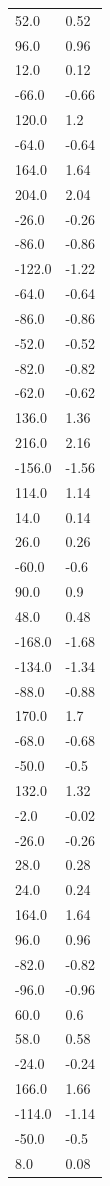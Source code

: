 \begin{longtable}{ll}
52.0 & 0.52 \\
96.0 & 0.96 \\
12.0 & 0.12 \\
-66.0 & -0.66 \\
120.0 & 1.2 \\
-64.0 & -0.64 \\
164.0 & 1.64 \\
204.0 & 2.04 \\
-26.0 & -0.26 \\
-86.0 & -0.86 \\
-122.0 & -1.22 \\
-64.0 & -0.64 \\
-86.0 & -0.86 \\
-52.0 & -0.52 \\
-82.0 & -0.82 \\
-62.0 & -0.62 \\
136.0 & 1.36 \\
216.0 & 2.16 \\
-156.0 & -1.56 \\
114.0 & 1.14 \\
14.0 & 0.14 \\
26.0 & 0.26 \\
-60.0 & -0.6 \\
90.0 & 0.9 \\
48.0 & 0.48 \\
-168.0 & -1.68 \\
-134.0 & -1.34 \\
-88.0 & -0.88 \\
170.0 & 1.7 \\
-68.0 & -0.68 \\
-50.0 & -0.5 \\
132.0 & 1.32 \\
-2.0 & -0.02 \\
-26.0 & -0.26 \\
28.0 & 0.28 \\
24.0 & 0.24 \\
164.0 & 1.64 \\
96.0 & 0.96 \\
-82.0 & -0.82 \\
-96.0 & -0.96 \\
60.0 & 0.6 \\
58.0 & 0.58 \\
-24.0 & -0.24 \\
166.0 & 1.66 \\
-114.0 & -1.14 \\
-50.0 & -0.5 \\
8.0 & 0.08 \\

\end{longtable}
